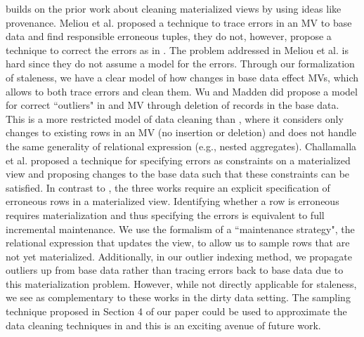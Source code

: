 \svc builds on the prior work about cleaning materialized views by using ideas like provenance.
Meliou et al. \cite{DBLP:conf/sigmod/MeliouGNS11} proposed a technique to trace errors in an MV to base data and find responsible erroneous tuples, they do not, however, propose a technique to correct the errors as in \svc.
The problem addressed in Meliou et al. is hard since they do not assume a model for the errors.
Through our formalization of staleness, we have a clear model of how changes in base data effect MVs, which allows to both trace errors and clean them.
Wu and Madden \cite{DBLP:journals/pvldb/0002M13} did propose a model for correct ``outliers" in and MV through deletion of records in the base data.
This is a more restricted model of data cleaning than \svc, where it considers only changes to existing rows in an MV (no insertion or deletion) and does not handle the same generality of relational expression (e.g., nested aggregates).
Challamalla et al. \cite{DBLP:conf/sigmod/ChalamallaIOP14} proposed a technique for specifying errors as constraints on a materialized view and proposing changes to the base data such that these constraints can be satisfied.
In contrast to \svc, the three works \cite{DBLP:conf/sigmod/MeliouGNS11, DBLP:journals/pvldb/0002M13, DBLP:conf/sigmod/ChalamallaIOP14} require an explicit specification of erroneous rows in a materialized view.
Identifying whether a row is erroneous requires materialization and thus specifying the errors is equivalent to full incremental maintenance. 
We use the formalism of a ``maintenance strategy", the relational expression that updates the view, to allow us to sample rows that are not yet materialized.
Additionally, in our outlier indexing method, we propagate outliers up from base data rather than tracing errors back to base data due to this materialization problem.
However, while not directly applicable for staleness, we see \svc as complementary to these works in the dirty data setting. 
The sampling technique proposed in Section 4 of our paper could be used to approximate the data cleaning techniques in \cite{DBLP:journals/pvldb/0002M13, DBLP:journals/pvldb/0002M13, DBLP:conf/sigmod/ChalamallaIOP14} and this is an exciting avenue of future work.



